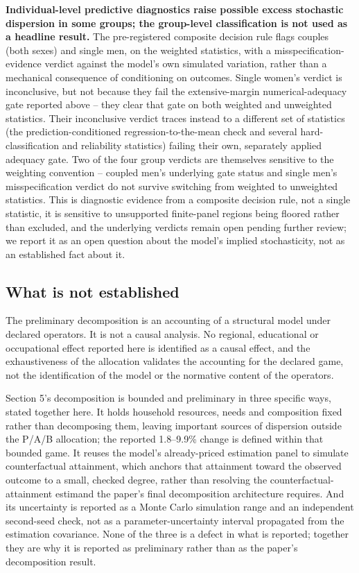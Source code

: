 \documentclass[11pt,a4paper]{article}
\begin{document}
\textbf{Individual-level predictive diagnostics raise possible excess stochastic dispersion in some groups; the group-level classification is not used as a headline result.} The pre-registered composite decision rule flags couples (both sexes) and single men, on the weighted statistics, with a misspecification-evidence verdict against the model's own simulated variation, rather than a mechanical consequence of conditioning on outcomes. Single women's verdict is inconclusive, but not because they fail the extensive-margin numerical-adequacy gate reported above -- they clear that gate on both weighted and unweighted statistics. Their inconclusive verdict traces instead to a different set of statistics (the prediction-conditioned regression-to-the-mean check and several hard-classification and reliability statistics) failing their own, separately applied adequacy gate. Two of the four group verdicts are themselves sensitive to the weighting convention -- coupled men's underlying gate status and single men's misspecification verdict do not survive switching from weighted to unweighted statistics. This is diagnostic evidence from a composite decision rule, not a single statistic, it is sensitive to unsupported finite-panel regions being floored rather than excluded, and the underlying verdicts remain open pending further review; we report it as an open question about the model's implied stochasticity, not as an established fact about it.

\subsection{What is not established}\label{what-is-not-established}

The preliminary decomposition is an accounting of a structural model under declared operators. It is not a causal analysis. No regional, educational or occupational effect reported here is identified as a causal effect, and the exhaustiveness of the allocation validates the accounting for the declared game, not the identification of the model or the normative content of the operators.

Section 5's decomposition is bounded and preliminary in three specific ways, stated together here. It holds household resources, needs and composition fixed rather than decomposing them, leaving important sources of dispersion outside the P/A/B allocation; the reported 1.8--9.9\% change is defined within that bounded game. It reuses the model's already-priced estimation panel to simulate counterfactual attainment, which anchors that attainment toward the observed outcome to a small, checked degree, rather than resolving the counterfactual-attainment estimand the paper's final decomposition architecture requires. And its uncertainty is reported as a Monte Carlo simulation range and an independent second-seed check, not as a parameter-uncertainty interval propagated from the estimation covariance. None of the three is a defect in what is reported; together they are why it is reported as preliminary rather than as the paper's decomposition result.
\end{document}
